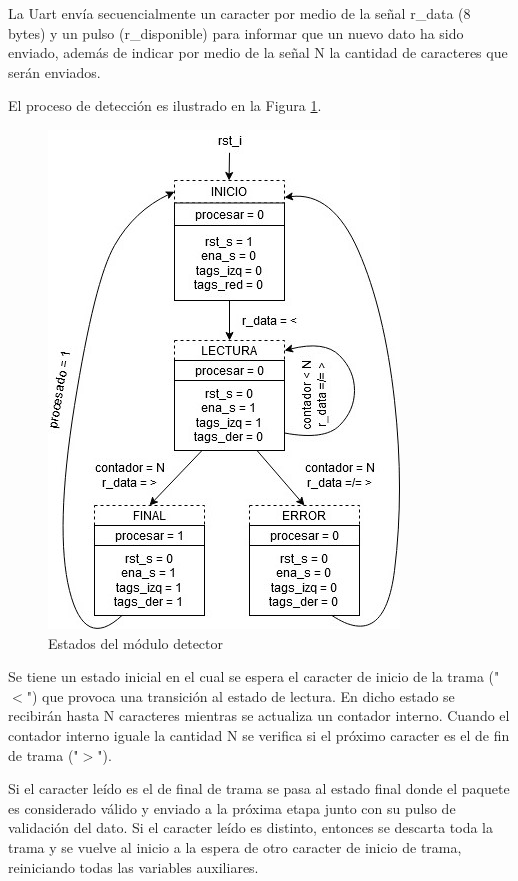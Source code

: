 		\vspace{5cm}
		
		La Uart envía secuencialmente un caracter por medio de la señal r\_data (8 bytes) y un pulso (r\_disponible) para informar que un nuevo dato ha sido enviado, además de indicar por medio de la señal N la cantidad de caracteres que serán enviados. 
		
		El proceso de detección es ilustrado en la Figura \ref{fig:Estados_Detector}.  		
		
		\begin{figure}[h]
		\centering
			\includegraphics[scale=.65,angle = -90]{./Figures/Estados-Detector}
			\caption{Estados del módulo detector}
			\label{fig:Estados_Detector}
		\end{figure}
		
		\vspace{10cm}
		
		Se tiene un estado inicial en el cual se espera el caracter de inicio de la trama ("$<$") que provoca una transición al estado de lectura. En dicho estado se recibirán hasta N caracteres mientras se actualiza un contador interno. Cuando el contador interno iguale la cantidad N se verifica si el próximo caracter es el de fin de trama ("$>$").
		
		Si el caracter leído es el de final de trama se pasa al estado final donde el paquete es considerado válido y enviado a la próxima etapa junto con su pulso de validación del dato. Si el caracter leído es distinto, entonces se descarta toda la trama y se vuelve al inicio a la espera de otro caracter de inicio de trama, reiniciando todas las variables auxiliares.
		
